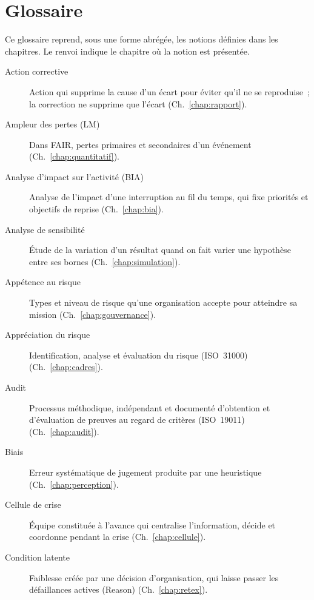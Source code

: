 
\chapter{Glossaire}
\label{ann:glossaire}

Ce glossaire reprend, sous une forme abrégée, les notions définies dans les
chapitres. Le renvoi indique le chapitre où la notion est présentée.

\begin{description}
    \item[Action corrective] Action qui supprime la cause d'un écart pour éviter qu'il ne se reproduise~; la correction ne supprime que l'écart (Ch.~\ref{chap:rapport}).
    \item[Ampleur des pertes (LM)] Dans FAIR, pertes primaires et secondaires d'un événement (Ch.~\ref{chap:quantitatif}).
    \item[Analyse d'impact sur l'activité (BIA)] Analyse de l'impact d'une interruption au fil du temps, qui fixe priorités et objectifs de reprise (Ch.~\ref{chap:bia}).
    \item[Analyse de sensibilité] Étude de la variation d'un résultat quand on fait varier une hypothèse entre ses bornes (Ch.~\ref{chap:simulation}).
    \item[Appétence au risque] Types et niveau de risque qu'une organisation accepte pour atteindre sa mission (Ch.~\ref{chap:gouvernance}).
    \item[Appréciation du risque] Identification, analyse et évaluation du risque (ISO~31000) (Ch.~\ref{chap:cadres}).
    \item[Audit] Processus méthodique, indépendant et documenté d'obtention et d'évaluation de preuves au regard de critères (ISO~19011) (Ch.~\ref{chap:audit}).
    \item[Biais] Erreur systématique de jugement produite par une heuristique (Ch.~\ref{chap:perception}).
    \item[Cellule de crise] Équipe constituée à l'avance qui centralise l'information, décide et coordonne pendant la crise (Ch.~\ref{chap:cellule}).
    \item[Condition latente] Faiblesse créée par une décision d'organisation, qui laisse passer les défaillances actives (Reason) (Ch.~\ref{chap:retex}).

\end{description}
